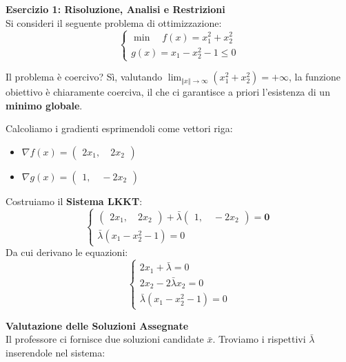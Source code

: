 \documentclass[12pt, a4paper]{article}
\newcommand{\separatore}{\noindent{\color{titlecolor!50}\rule{\textwidth}{0.6pt}}}
\begin{document}
	\vspace{0.6cm}
	\separatore
	\vspace{0.4cm}
	
	\textbf{Esercizio 1: Risoluzione, Analisi e Restrizioni}\\[0.2cm]
	Si consideri il seguente problema di ottimizzazione:
	\[
	\begin{cases}
		\min \quad f(x) = x_1^2 + x_2^2 \\[6pt]
		g(x) = x_1 - x_2^2 - 1 \le 0
	\end{cases}
	\]
	
	Il problema è coercivo? Sì, valutando $\lim_{\Vert x \Vert \to \infty} (x_1^2 + x_2^2) = +\infty$, la funzione obiettivo è chiaramente coerciva, il che ci garantisce a priori l'esistenza di un \textbf{minimo globale}.
	
	Calcoliamo i gradienti esprimendoli come vettori riga:
	\begin{itemize}
		\item $\nabla f(x) = \begin{pmatrix} 2x_1, \quad 2x_2 \end{pmatrix}$
		\item $\nabla g(x) = \begin{pmatrix} 1, \quad -2x_2 \end{pmatrix}$
	\end{itemize}
	
	Costruiamo il \textbf{Sistema LKKT}:
	\[
	\begin{cases}
		\begin{pmatrix} 2x_1, \quad 2x_2 \end{pmatrix} + \bar{\lambda} \begin{pmatrix} 1, \quad -2x_2 \end{pmatrix} = \mathbf{0} \\[6pt]
		\bar{\lambda} (x_1 - x_2^2 - 1) = 0
	\end{cases}
	\]
	Da cui derivano le equazioni:
	\[
	\begin{cases}
		2x_1 + \bar{\lambda} = 0 \\
		2x_2 - 2\bar{\lambda} x_2 = 0 \\
		\bar{\lambda} (x_1 - x_2^2 - 1) = 0
	\end{cases}
	\]
	
	\textbf{Valutazione delle Soluzioni Assegnate}\\
	Il professore ci fornisce due soluzioni candidate $\bar{x}$. Troviamo i rispettivi $\bar{\lambda}$ inserendole nel sistema:
	
\end{document}
